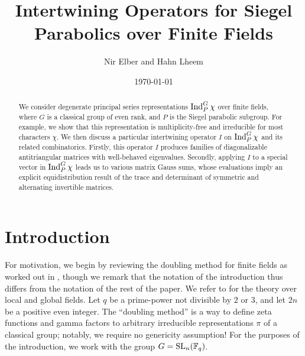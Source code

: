 \documentclass{amsart}
\title{Intertwining Operators for Siegel Parabolics over Finite Fields}
\author{Nir Elber and Hahn Lheem}
\date{\today}
\begin{document}
\begin{abstract}
    We consider degenerate principal series representations $\operatorname{Ind}_P^G\chi$ over finite fields, where $G$ is a classical group of even rank, and $P$ is the Siegel parabolic subgroup. For example, we show that this representation is multiplicity-free and irreducible for most characters $\chi$. We then discuss a particular intertwining operator $I$ on $\operatorname{Ind}_P^G\chi$ and its related combinatorics. Firstly, this operator $I$ produces families of diagonalizable antitriangular matrices with well-behaved eigenvalues. Secondly, applying $I$ to a special vector in $\operatorname{Ind}_P^G\chi$ leads us to various matrix Gauss sums, whose evaluations imply an explicit equidistribution result of the trace and determinant of symmetric and alternating invertible matrices.
\end{abstract}

\maketitle


\tableofcontents

\section{Introduction}
For motivation, we begin by reviewing the doubling method for finite fields as worked out in \cite{chang-doubling}, though we remark that the notation of the introduction thus differs from the notation of the rest of the paper. We refer to \cite{ps-r-doubling} for the theory over local and global fields. Let $q$ be a prime-power not divisible by $2$ or $3$, and let $2n$ be a positive even integer. The ``doubling method'' is a way to define zeta functions and gamma factors to arbitrary irreducible representations $\pi$ of a classical group; notably, we require no genericity assumption! For the purposes of the introduction, we work with the group $G=\operatorname{SL}_n(\mathbb F_q)$.
\end{document}
